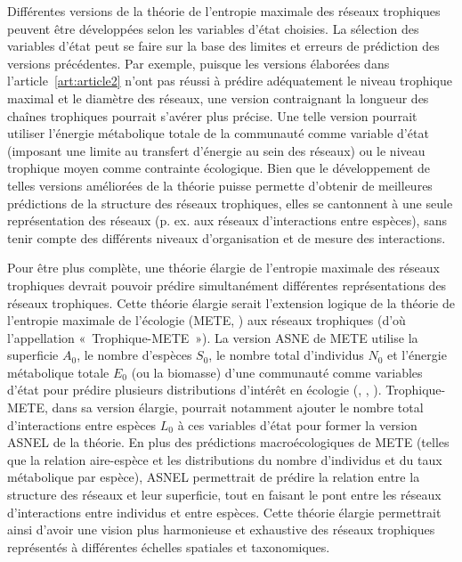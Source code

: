 Différentes versions de la théorie de l'entropie maximale des réseaux trophiques
peuvent être développées selon les variables d'état choisies. La sélection des
variables d'état peut se faire sur la base des limites et erreurs de prédiction
des versions précédentes. Par exemple, puisque les versions élaborées dans
l'article~\ref{art:article2} n'ont pas réussi à prédire adéquatement le niveau
trophique maximal et le diamètre des réseaux, une version contraignant la
longueur des chaînes trophiques pourrait s'avérer plus précise. Une telle
version pourrait utiliser l'énergie métabolique totale de la communauté comme
variable d'état (imposant une limite au transfert d'énergie au sein des réseaux)
ou le niveau trophique moyen comme contrainte écologique. Bien que le
développement de telles versions améliorées de la théorie puisse permette
d'obtenir de meilleures prédictions de la structure des réseaux trophiques,
elles se cantonnent à une seule représentation des réseaux (p. ex. aux réseaux
d'interactions entre espèces), sans tenir compte des différents niveaux
d'organisation et de mesure des interactions.

Pour être plus complète, une théorie élargie de l'entropie maximale des réseaux
trophiques devrait pouvoir prédire simultanément différentes représentations des
réseaux trophiques. Cette théorie élargie serait l'extension logique de la
théorie de l'entropie maximale de l'écologie (METE, \cite{Harte2011Maximum}) aux
réseaux trophiques (d'où l'appellation «~Trophique-METE~»). La version ASNE de
METE utilise la superficie $A_0$, le nombre d'espèces $S_0$, le nombre total
d'individus $N_0$ et l'énergie métabolique totale $E_0$ (ou la biomasse) d'une
communauté comme variables d'état pour prédire plusieurs distributions d'intérêt
en écologie (\cite{Harte2008Maximum}, \cite{Harte2011Maximum},
\cite{Harte2014Maximum}). Trophique-METE, dans sa version élargie, pourrait
notamment ajouter le nombre total d'interactions entre espèces $L_0$ à ces
variables d'état pour former la version ASNEL de la théorie. En plus des
prédictions macroécologiques de METE (telles que la relation aire-espèce et les
distributions du nombre d'individus et du taux métabolique par espèce), ASNEL
permettrait de prédire la relation entre la structure des réseaux et leur
superficie, tout en faisant le pont entre les réseaux d'interactions entre
individus et entre espèces. Cette théorie élargie permettrait ainsi d'avoir une
vision plus harmonieuse et exhaustive des réseaux trophiques représentés à
différentes échelles spatiales et taxonomiques.

